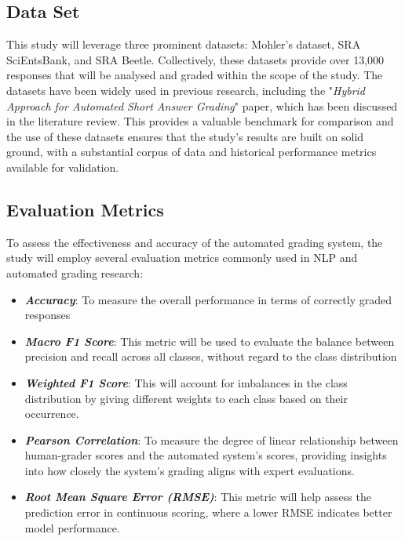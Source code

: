 \documentclass[a4paper,10pt]{article}
\begin{document}
\subsection{Data Set}
This study will leverage three prominent datasets: Mohler's dataset, SRA SciEntsBank, and SRA Beetle. Collectively, these datasets provide over 13,000 responses that will be analysed and graded within the scope of the study. The datasets have been widely used in previous research, including the "\textit{Hybrid Approach for Automated Short Answer Grading}" paper, which has been discussed in the literature review. This provides a valuable benchmark for comparison and the use of these datasets ensures that the study’s results are built on solid ground, with a substantial corpus of data and historical performance metrics available for validation.
\subsection{Evaluation Metrics}
To assess the effectiveness and accuracy of the automated grading system, the study will employ several evaluation metrics commonly used in NLP and automated grading research:
 \begin{itemize}
     \item \textit{\textbf{Accuracy}}: To measure the overall performance in terms of correctly graded responses\cite{kaya2024hybrid}
     \item \textit{\textbf{Macro F1 Score}}: This metric will be used to evaluate the balance between precision and recall across all classes, without regard to the class distribution\cite{kaya2024hybrid}
     \item \textit{\textbf{Weighted F1 Score}}: This will account for imbalances in the class distribution by giving different weights to each class based on their occurrence\cite{kaya2024hybrid}.
     \item \textit{\textbf{Pearson Correlation}}: To measure the degree of linear relationship between human-grader scores and the automated system’s scores, providing insights into how closely the system’s grading aligns with expert evaluations\cite{kaya2024hybrid}.
     \item \textit{\textbf{Root Mean Square Error (RMSE)}}: This metric will help assess the prediction error in continuous scoring, where a lower RMSE indicates better model performance\cite{kaya2024hybrid}.
 \end{itemize}
\end{document}
